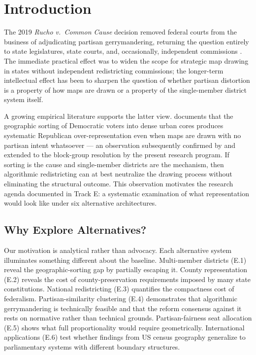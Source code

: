 \section{Introduction}
\label{sec:intro}

The 2019 \emph{Rucho v.\ Common Cause} decision removed federal courts from
the business of adjudicating partisan gerrymandering, returning the question
entirely to state legislatures, state courts, and, occasionally, independent
commissions \citep{rucho2019}.  The immediate practical effect was to widen
the scope for strategic map drawing in states without independent redistricting
commissions; the longer-term intellectual effect has been to sharpen the
question of whether partisan distortion is a property of how maps are drawn or
a property of the single-member district system itself.

A growing empirical literature supports the latter view.  \citet{rodden2019why}
documents that the geographic sorting of Democratic voters into dense urban
cores produces systematic Republican over-representation even when maps are
drawn with no partisan intent whatsoever --- an observation subsequently
confirmed by \citet{chen2013unintentional} and extended to the block-group
resolution by the present research program.  If sorting is the cause and
single-member districts are the mechanism, then algorithmic redistricting can
at best neutralize the drawing process without eliminating the structural
outcome.  This observation motivates the research agenda documented in Track E:
a systematic examination of what representation would look like under six
alternative architectures.

\subsection{Why Explore Alternatives?}

Our motivation is analytical rather than advocacy.  Each alternative system
illuminates something different about the baseline.  Multi-member districts
(E.1) reveal the geographic-sorting gap by partially escaping it.  County
representation (E.2) reveals the cost of county-preservation requirements
imposed by many state constitutions.  National redistricting (E.3) quantifies
the compactness cost of federalism.  Partisan-similarity clustering (E.4)
demonstrates that algorithmic gerrymandering is technically feasible and that
the reform consensus against it rests on normative rather than technical
grounds.  Partisan-fairness seat allocation (E.5) shows what full
proportionality would require geometrically.  International applications (E.6)
test whether findings from US census geography generalize to parliamentary
systems with different boundary structures.

